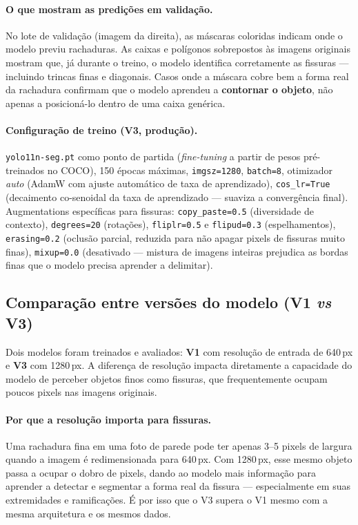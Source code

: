 \documentclass[11pt,a4paper]{article}
\begin{document}
\paragraph{O que mostram as predições em validação.}
No lote de validação (imagem da direita), as máscaras coloridas indicam onde o modelo previu
rachaduras. As caixas e polígonos sobrepostos às imagens originais mostram que, já durante
o treino, o modelo identifica corretamente as fissuras — incluindo trincas finas e diagonais.
Casos onde a máscara cobre bem a forma real da rachadura confirmam que o modelo aprendeu a
\textbf{contornar o objeto}, não apenas a posicioná-lo dentro de uma caixa genérica.

{\sloppy
\paragraph{Configuração de treino (V3, produção).}
\texttt{yolo11n-seg.pt} como ponto de partida (\emph{fine-tuning} a partir de pesos pré-treinados
no COCO), 150 épocas máximas, \texttt{imgsz=1280}, \texttt{batch=8}, otimizador \emph{auto}
(AdamW com ajuste automático de taxa de aprendizado), \texttt{cos\_lr=True} (decaimento
co-senoidal da taxa de aprendizado — suaviza a convergência final).
Augmentations específicas para fissuras: \texttt{copy\_paste=0.5} (diversidade de contexto),
\texttt{degrees=20} (rotações), \texttt{fliplr=0.5} e \texttt{flipud=0.3} (espelhamentos),
\texttt{erasing=0.2} (oclusão parcial, reduzida para não apagar pixels de fissuras muito finas),
\texttt{mixup=0.0} (desativado — mistura de imagens inteiras prejudica as bordas finas que o
modelo precisa aprender a delimitar).
\par}

\subsection{Comparação entre versões do modelo (V1 \emph{vs} V3)}

Dois modelos foram treinados e avaliados: \textbf{V1} com resolução de entrada de 640\,px e
\textbf{V3} com 1280\,px. A diferença de resolução impacta diretamente a capacidade do modelo
de perceber objetos finos como fissuras, que frequentemente ocupam poucos pixels nas imagens
originais.

\paragraph{Por que a resolução importa para fissuras.}
Uma rachadura fina em uma foto de parede pode ter apenas 3--5 pixels de largura quando a
imagem é redimensionada para 640\,px. Com 1280\,px, esse mesmo objeto passa a ocupar o dobro
de pixels, dando ao modelo mais informação para aprender a detectar e segmentar a forma real
da fissura — especialmente em suas extremidades e ramificações. É por isso que o V3 supera o
V1 mesmo com a mesma arquitetura e os mesmos dados.
\end{document}
